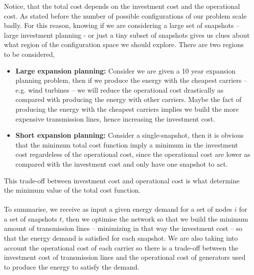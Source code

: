 Notice, that the total cost depends on the investment cost and the operational cost. As stated before the number of possible configurations of our problem scale badly. For this reason, knowing if we are considering a large set of snapshots -- large investment planning - or just a tiny subset of snapshots gives us clues about what region of the configuration space we should explore. There are two regions to be considered,
\begin{itemize}
    \item \textbf{Large expansion planning:} Consider we are given a 10 year expansion planning problem, then if we produce the energy with the  cheapest carriers -- e.g. wind turbines -- we will reduce the operational cost drastically as compared with producing the energy with other carriers. Maybe the fact of producing the energy with the cheapest carriers implies we build the more expensive transmission lines, hence increasing the investment cost.
    \item \textbf{Short expansion planning:} Consider a single-snapshot, then it is obvious that the minimum total cost function imply a minimum in the investment cost regardeless of the operational cost, since the operational cost are lower as compared with the investment cost and only have one snapshot to act.
\end{itemize}
This trade-off between investment cost and operational cost is what determine the minimum value of the total cost function.\\\\
To summarise, we receive as input a given energy demand for a set of nodes $i$ for a set of snapshots $t$, then we optimise the network so that we build the minimum amount of transmission lines -- minimizing in that way the investment cost -- so that the energy demand is satisfied for each snapshot. We are also taking into account the operational cost of each carrier so there is a trade-off between the investment cost of transmission lines and the operational cost of generators used to produce the energy to satisfy the demand.

